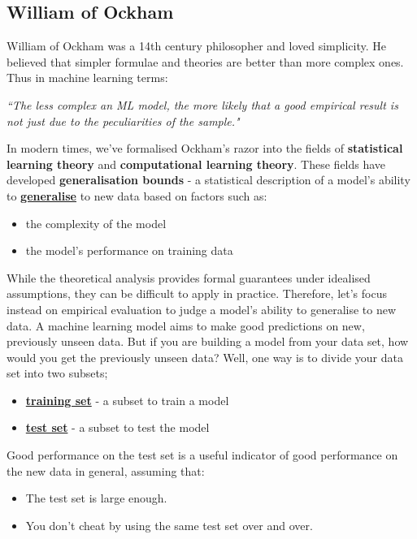 \documentclass[12pt]{article}
\begin{document}
\subsection{William of Ockham}
William of Ockham was a 14th century philosopher and loved simplicity. He believed that simpler formulae and theories are better than more complex ones. Thus in machine learning terms:
\begin{center}
	\textit{``The less complex an ML model, the more likely that a good empirical result is not just due to the peculiarities of the sample."}
\end{center}
In modern times, we've formalised Ockham's razor into the fields of \textbf{statistical learning theory} and \textbf{computational learning theory}. These fields have developed \textbf{generalisation bounds} - a statistical description of a model's ability to \href{https://developers.google.com/machine-learning/glossary#generalization}{\textbf{generalise}} to new data based on factors such as:
\begin{itemize}
	\item the complexity of the model
	\item the model's performance on training data
\end{itemize}
While the theoretical analysis provides formal guarantees under idealised assumptions, they can be difficult to apply in practice. Therefore, let's focus instead on empirical evaluation to judge a model's ability to generalise to new data.
A machine learning model aims to make good predictions on new, previously unseen data. But if you are building a model from your data set, how would you get the previously unseen data? Well, one way is to divide your data set into two subsets; 
\begin{itemize}
	\item \href{https://developers.google.com/machine-learning/glossary#training_set}{\textbf{training set}} - a subset to train a model
	\item \href{https://developers.google.com/machine-learning/glossary#test_set}{\textbf{test set}} - a subset to test the model
\end{itemize}
Good performance on the test set is a useful indicator of good performance on the new data in general, assuming that:
\begin{itemize}
	\item The test set is large enough.
	\item You don't cheat by using the same test set over and over.
\end{itemize}
\end{document}
